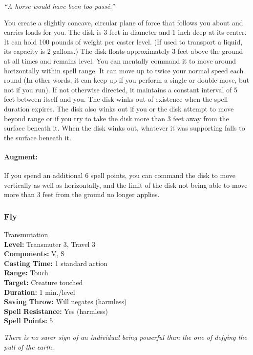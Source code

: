 \emph{``A horse would have been too passé.''}

You create a slightly concave, circular plane of force that follows you about and carries loads for you. 
The disk is 3 feet in diameter and 1 inch deep at its center. 
It can hold 100 pounds of weight per caster level. (If used to transport a liquid, its capacity is 2 gallons.) 
The disk floats approximately 3 feet above the ground at all times and remains level. 
You can mentally command it to move around horizontally within spell range. 
It can move up to twice your normal speed each round (In other words, it can keep up if you perform a single or double move, but not if you run).
If not otherwise directed, it maintains a constant interval of 5 feet between itself and you. 
The disk winks out of existence when the spell duration expires. 
The disk also winks out if you or the disk attempt to move beyond range or if you try to take the disk more than 3 feet away from the surface beneath it. 
When the disk winks out, whatever it was supporting falls to the surface beneath it.

\paragraph{Augment:} If you spend an additional 6 spell points, you can command the disk to move vertically as well as horizontally, and the limit of
the disk not being able to move more than 3 feet from the ground no longer applies.

\subsubsection{Fly}
\label{Spell:Fly}
Transmutation
\\ \textbf{Level:} Transmuter 3, Travel 3
\\ \textbf{Components:} V, S
\\ \textbf{Casting Time:} 1 standard action
\\ \textbf{Range:} Touch
\\ \textbf{Target:} Creature touched
\\ \textbf{Duration:} 1 min./level
\\ \textbf{Saving Throw:} Will negates (harmless)
\\ \textbf{Spell Resistance:} Yes (harmless)
\\ \textbf{Spell Points:} 5

\emph{There is no surer sign of an individual being powerful than the one of defying the pull of the earth.}

